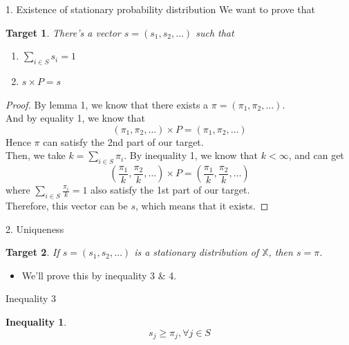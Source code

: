 \documentclass[mathserif]{beamer}
\newtheorem{ineq}{Inequality}
\newtheorem{target}{Target}
\begin{document}
\begin{frame}{1. Existence of stationary probability distribution}\label{existence}
	We want to prove that
	\begin{target}
		There's a vector $s = (s_1, s_2, \ldots)$ such that
		\begin{enumerate}
			\item $\sum_{i \in S} s_i = 1$
			\item $s \times P = s$
		\end{enumerate}
	\end{target}
\end{frame}

\begin{frame}
	\begin{proof}
		By lemma 1, we know that there exists a $\pi = (\pi_1, \pi_2, \ldots)$. \\
		And by equality 1, we know that
		\[
		(\pi_1, \pi_2, \ldots) \times P = (\pi_1, \pi_2, \ldots)
		\]
		Hence $\pi$ can satisfy the 2nd part of our target. \\
		Then, we take $k = \sum_{i \in S} \pi_i$.
		By inequality 1, we know that $k < \infty$, and can get
		\[
		(\frac{\pi_1}{k}, \frac{\pi_2}{k}, \ldots) \times P = (\frac{\pi_1}{k}, \frac{\pi_2}{k}, \ldots)
		\]
		where $\sum_{i \in S} \frac{\pi_i}{k} = 1$ also satisfy the 1st part of our target. \\
		Therefore, this vector can be $s$, which means that it exists.
	\end{proof}
\end{frame}

\begin{frame}{2. Uniqueness}\label{uniqueness}
	\begin{target}
		If $s = (s_1, s_2, \ldots)$ is a stationary distribution of $\mathbb{X}$, then $s = \pi$.
	\end{target}
	\begin{itemize}
		\item We'll prove this by inequality 3 \& 4.
	\end{itemize}
\end{frame}

\begin{frame}{Inequality 3}
	\begin{ineq}
		\[
		s_j \geq \pi_j, \forall j \in S
		\]
	\end{ineq}
\end{frame}
\end{document}

